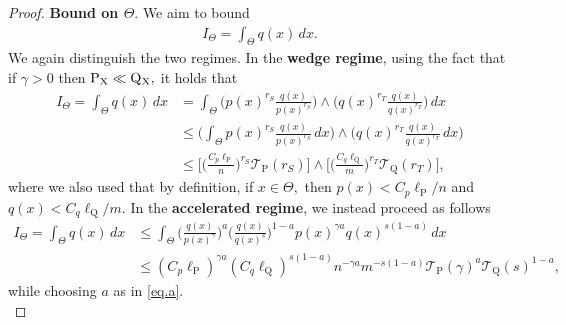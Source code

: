 \documentclass[10pt,a4paper]{amsart}
\renewcommand{\P}{\operatorname{P}}
\newcommand{\Q}{\operatorname{Q}}
\newcommand{\mT}{\mathcal{T}}
\newcommand{\sX}{\mathrm{X}}
\begin{document}
\begin{proof}
    \noindent\textbf{Bound on $\Theta.$} We aim to bound
    \begin{align*}
        I_{\Theta} = \int_{\Theta}q(x)\, dx.
    \end{align*}
    We again distinguish the two regimes. In the \textbf{wedge regime}, using the fact that if $\gamma > 0$ then $\P_{\sX} \ll \Q\mathstrut_{\!\sX},$ it holds that 
    \begin{align*}
        I_{\Theta} = \int_{\Theta}q(x)\, dx &= \int_{\Theta}\Big(p(x)^{r_S}\frac{q(x)}{p(x)^{r_S}}\Big)\wedge \Big(q(x)^{r_T}\frac{q(x)}{q(x)^{r_T}}\Big)\, dx\\
        &\leq \bigg(\int_{\Theta}p(x)^{r_S}\frac{q(x)}{p(x)^{r_S}}\, dx\bigg)\wedge\bigg(q(x)^{r_T}\frac{q(x)}{q(x)^{r_T}}\, dx\bigg)\\
        &\leq \Big[\Big(\frac{C_p\ell_{\P}}{n}\Big)^{r_S}\mT_{\P}(r_S)\Big]\wedge \Big[\Big(\frac{C_q\ell_{\Q}}{m}\Big)^{r_T}\mT_{\Q}(r_T)\Big],
    \end{align*}
    where we also used that by definition, if $x \in \Theta,$ then $p(x) < C_p\ell_{\P}/n$ and $q(x) < C_q\ell_{\Q}/m.$ In the \textbf{accelerated regime}, we instead proceed as follows
    \begin{align*}
        I_{\Theta} = \int_{\Theta}q(x)\, dx &\leq \int_{\Theta} \Big(\frac{q(x)}{p(x)^{\gamma}}\Big)^a\Big(\frac{q(x)}{q(x)^s}\Big)^{1 - a}p(x)^{\gamma a}q(x)^{s(1 - a)}\, dx\\
        &\leq (C_p\ell_{\P})^{\gamma a}(C_q\ell_{\Q})^{s(1 - a)}n^{-\gamma a}m^{-s(1 - a)}\mT_{\P}(\gamma)^{a}\mT_{\Q}(s)^{1-a},
    \end{align*}
    while choosing $a$ as in \eqref{eq.a}.\\
    

\end{proof}
\end{document}
